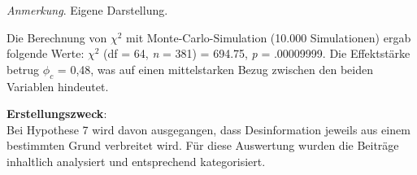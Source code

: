 \documentclass[12pt,a4paper]{article}        %
\begin{document}
\begin{table}[H]
  \caption{\textit{Kreuztabelle zwischen Thematik des Beitrags und des visuellen Artefakts}}
  \label{tab:results_visual_coherence_xtable}
  \centering
  \footnotesize\textit{Anmerkung}. Eigene Darstellung.
\end{table}
Die Berechnung von \(\chi^2\) mit Monte-Carlo-Simulation (10.000 Simulationen) ergab folgende Werte: \(\chi^2\) (df = 64, \textit{n} = 381) = 694.75, \textit{p} = .00009999. Die Effektstärke betrug \(\phi_c\) = 0,48,  was auf einen mittelstarken Bezug zwischen den beiden Variablen hindeutet.

\textbf{Erstellungszweck}:\\
Bei Hypothese 7 wird davon ausgegangen, dass Desinformation jeweils aus einem bestimmten Grund verbreitet wird. Für diese Auswertung wurden die Beiträge inhaltlich analysiert und entsprechend kategorisiert.
\end{document}
